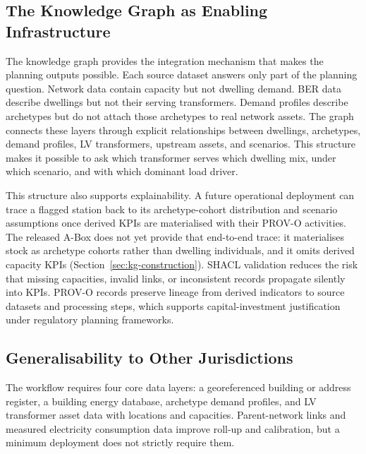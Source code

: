 \documentclass[preprint,12pt]{elsarticle}
\begin{document}
\subsection{The Knowledge Graph as Enabling Infrastructure}
\label{sec:kg_enabling}

The knowledge graph provides the integration mechanism that makes the
planning outputs possible.
Each source dataset answers only part of the planning question.
Network data contain capacity but not dwelling demand.
BER data describe dwellings but not their serving transformers.
Demand profiles describe archetypes but do not attach those archetypes to
real network assets.
The graph connects these layers through explicit relationships between
dwellings, archetypes, demand profiles, LV transformers, upstream assets,
and scenarios.
This structure makes it possible to ask which transformer serves which
dwelling mix, under which scenario, and with which dominant load driver.

This structure also supports explainability.
A future operational deployment can trace a flagged station back to its
archetype-cohort distribution and scenario assumptions once derived KPIs are
materialised with their PROV-O activities. The released A-Box does not yet
provide that end-to-end trace: it materialises stock as archetype cohorts
rather than dwelling individuals, and it omits derived capacity KPIs
(Section~\ref{sec:kg-construction}).
SHACL validation reduces the risk that missing capacities, invalid links,
or inconsistent records propagate silently into KPIs.
PROV-O records preserve lineage from derived indicators to source datasets
and processing steps, which supports capital-investment justification under
regulatory planning frameworks.

\subsection{Generalisability to Other Jurisdictions}
\label{sec:generalisability}

The workflow requires four core data layers: a georeferenced building or
address register, a building energy database, archetype demand profiles,
and LV transformer asset data with locations and capacities.
Parent-network links and measured electricity consumption data improve
roll-up and calibration, but a minimum deployment does not strictly require
them.
\end{document}
